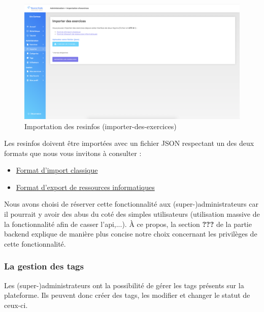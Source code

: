 \begin{figure}[H]
    \includegraphics[width=\textwidth,height=\textheight,keepaspectratio]{images/client/import.png}
    \centering
    \caption[SourceCode : importation des \glspl{resinfo}]{Importation des \glspl{resinfo} (importer-des-exercices)}
\end{figure}

Les \glspl{resinfo} doivent être importées avec un fichier JSON respectant un des deux formats que nous vous invitons à consulter :

\begin{itemize}
    \item \href{https://sourcecodeoer.github.io/sourcecode_api/#operation/createMultipleExercises}{Format d'import classique}
    \item \href{https://sourcecodeoer.github.io/sourcecode_api/#operation/ExportExercises}{Format d'export de ressources informatiques}
\end{itemize}

Nous avons choisi de réserver cette fonctionnalité aux (super-)administrateurs car il pourrait y avoir des abus du coté des simples utilisateurs (utilisation massive de la fonctionnalité afin de casser l'api,...). À ce propos, la section \textbf{???} de la partie backend explique de manière plus concise notre choix concernant les privilèges de cette fonctionnalité.

\subsubsection{La gestion des \glspl{tag}}
\label{section:tagAdmin}

Les (super-)administrateurs ont la possibilité de gérer les \glspl{tag} présents sur la plateforme. Ils peuvent donc créer des \glspl{tag}, les modifier et changer le statut de ceux-ci.\\

